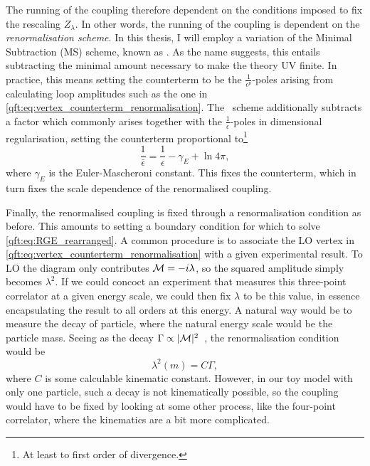\documentclass[../main.tex]{subfiles}
\begin{document}
The running of the coupling therefore dependent on the conditions imposed to fix the rescaling \(Z_\lambda\).
In other words, the running of the coupling is dependent on the \emph{renormalisation scheme}.
In this thesis, I will employ a variation of the Minimal Subtraction (MS) scheme, known as \MSbar\@.
As the name suggests, this entails subtracting the minimal amount necessary to make the theory UV finite.
In practice, this means setting the counterterm to be the \(\frac{1}{\epsilon^p}\)-poles arising from calculating loop amplitudes such as the one in \cref{qft:eq:vertex_counterterm_renormalisation}.
The \MSbar\ scheme additionally subtracts a factor which commonly arises together with the \(\frac{1}{\epsilon}\)-poles in dimensional regularisation, setting the counterterm proportional to\footnote{At least to first order of divergence.}
\begin{equation}
  \frac{1}{\bar\epsilon} = \frac{1}{\epsilon} - \gamma_E + \ln 4\pi,
\end{equation}
where \(\gamma_E\) is the Euler-Mascheroni constant.
This fixes the counterterm, which in turn fixes the scale dependence of the renormalised coupling.
\medskip

Finally, the renormalised coupling is fixed through a renormalisation condition as before.
This amounts to setting a boundary condition for which to solve \cref{qft:eq:RGE_rearranged}.
A common procedure is to associate the LO vertex in \cref{qft:eq:vertex_counterterm_renormalisation} with a given experimental result.
To LO the diagram only contributes \(\mathcal{M} = -i\lambda\), so the squared amplitude simply becomes \(\lambda^2\).
If we could concoct an experiment that measures this three-point correlator at a given energy scale, we could then fix \(\lambda\) to be this value, in essence encapsulating the result to all orders at this energy.
A natural way would be to measure the decay of particle, where the natural energy scale would be the particle mass.
Seeing as the decay \(\Gamma \propto |\mathcal{M}|^2\)~\cite{Schwartz:2014sze}, the renormalisation condition would be
\begin{equation}
  \lambda^2(m) = C \Gamma,
\end{equation}
where \(C\) is some calculable kinematic constant.
However, in our toy model with only one particle, such a decay is not kinematically possible, so the coupling would have to be fixed by looking at some other process, like the four-point correlator, where the kinematics are a bit more complicated.
\end{document}
